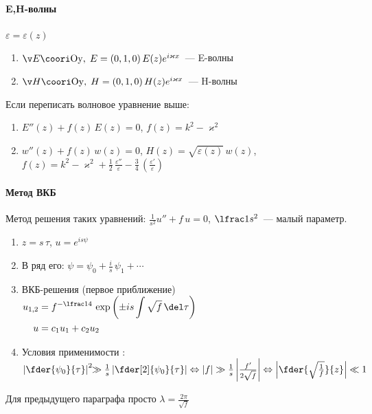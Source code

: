 \documentclass{trchesh}
\begin{document}
\begin{multicols*}{3}
\paragraph{E,H-волны}
$\varepsilon = \varepsilon(z)$
\begin{enumerate}
  \item $\v E \coori \mathrm{Oy},\; E = (0,1,0)\, E(z) e^{i \varkappa x}$~--- E-волны
  \item $\v H \coori \mathrm{Oy},\; H = (0,1,0)\, H(z) e^{i \varkappa x}$~--- H-волны
\end{enumerate}
Если переписать волновое уравнение выше:
\begin{enumerate}
  \item $E''(z) + f(z) \, E(z) = 0$, $f(z) = k^2 - \varkappa^2$
  \item $w''(z) + f(z) \, w(z) = 0$, $H(z) = \sqrt{\varepsilon(z)}\, w(z)$,
    $f(z) = k^2 - \varkappa^2
    + \frac 12\, \frac{\varepsilon''}{\varepsilon} 
    - \frac 34\, \left(\frac{\varepsilon'}{\varepsilon}\right)$
\end{enumerate}
\paragraph{Метод ВКБ}
Метод решения таких уравнений: $\frac 1{s^2} u'' + f\, u = 0$, $\lfrac 1{s^2}$~--- малый параметр.
\begin{enumerate}
  \item $z = s\,\tau$, $u = e^{is \psi}$ 
  \item В ряд его: $\psi = \psi_0 + \frac is\,\psi_1 + \dotsb $
  \item ВКБ-решения (первое приближение)
    $
    \begin{aligned}
      u_{1,2} &= f^{-\lfrac 14}\, \exp \left({\pm is\int\sqrt{f}\, \del \tau}\right)\\
      u       &= c_1 u_1 + c_2 u_2
    \end{aligned}
    $
  \item Условия применимости \quest:\\ 
    $
    \left\lvert \fder{\psi_0}{\tau} \right\rvert^2 \!\!\gg
    \frac{1}{s} \left\lvert\fder[2]{\psi_0}{\tau}\right\rvert
    \Leftrightarrow 
    |f| \gg \frac 1s \left\lvert \frac{f'}{2\sqrt f} \right\rvert
    \Leftrightarrow 
    \left\lvert \fder{{\sqrt \frac 1f}}{z} \right\rvert \ll 1
    $
\end{enumerate}
Для предыдущего параграфа просто $ \lambda = \frac{2 \pi}{\sqrt{f}}$


\end{multicols*}
\end{document}
